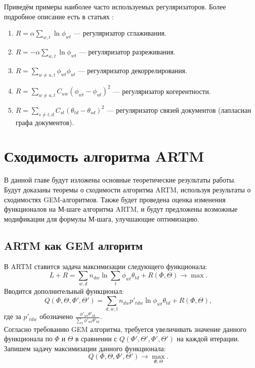 \documentclass[12pt, twoside]{article}
\begin{document}
Приведём примеры наиболее часто используемых регуляризаторов. Более подробное описание есть в статьях \cite{artmdef1, artmdef2, artmdef3}:
\begin{enumerate}
\item $R = \alpha \sum\limits_{w, t} \ln \phi_{wt}$ --- регуляризатор сглаживания.
\item $R = -\alpha \sum\limits_{w, t} \ln \phi_{wt}$ --- регуляризатор разреживания.
\item $R = \sum\limits_{w \neq u, t} \phi_{wt} \phi_{ut}$ --- регуляризатор декоррелирования.
\item $R = \sum\limits_{w \neq u, t} C_{uw}\left( \phi_{wt}  - \phi_{ut} \right)^2$ --- регуляризатор когерентности.
\item $R = \sum\limits_{s \neq t, d} C_{st}\left( \theta_{td}  - \theta_{sd} \right)^2$ --- регуляризатор связей документов (лапласиан графа документов).
\end{enumerate}


\section{Сходимость алгоритма ARTM}
	В данной главе будут изложены основные теоретические результаты работы. Будут доказаны теоремы о сходимости алгоритма ARTM, используя результаты о сходимостях GEM-алгоритмов. Также будет проведена оценка изменения функционалов на М-шаге алгоритма ARTM, и будут предложены возможные модификации для формулы М-шага, улучшающие оптимизацию. 
	
\subsection{ARTM как GEM алгоритм}
\label{subsec:artmasgem}

В ARTM ставится задача максимизации следующего функционала:
\[
L + R = \sum_{w,d} n_{dw} \ln\sum_t \phi_{wt} \theta_{td} +  R(\Phi, \Theta) \to \max.
\]
Вводится дополнительный функционал:
\[
	Q(\Phi, \Theta, \Phi', \Theta') = \sum\limits_{d, w, t} n_{dw} p'_{tdw} \ln{\phi_{wt}\theta_{td}} + R(\Phi, \Theta),
\]
где за $p'_{tdw}$ обозначено $\frac{\phi'_{wt} \theta'_{td}}{\sum\limits_t \phi'_{wt} \theta'_{td}}$.\\

Согласно требованию GEM алгоритма, требуется увеличивать значение данного функционала по $\Phi$ и $\Theta$ в сравнении с $Q(\Phi', \Theta', \Phi', \Theta')$ на каждой итерации. Запишем задачу максимизации данного функционала:
\[
Q(\Phi, \Theta, \Phi', \Theta') \to \max_{\Phi, \Theta}.
\]
\end{document}
